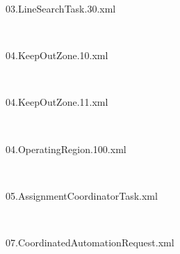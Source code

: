 \begin{fullwidth}
\begin{description}
        \item[\hypertarget{msg:03.LineSearchTask.30.xml}{03.LineSearchTask.30.xml}]  \hfill \ 
        \item[\hypertarget{msg:04.KeepOutZone.10.xml}{04.KeepOutZone.10.xml}]  \hfill \ 
        \item[\hypertarget{msg:04.KeepOutZone.11.xml}{04.KeepOutZone.11.xml}]  \hfill \ 
        \item[\hypertarget{msg:04.OperatingRegion.100.xml}{04.OperatingRegion.100.xml}]  \hfill \ 
        \item[\hypertarget{msg:05.AssignmentCoordinatorTask.xml}{05.AssignmentCoordinatorTask.xml}]  \hfill \ 
        \item[\hypertarget{msg:07.CoordinatedAutomationRequest.xml}{07.CoordinatedAutomationRequest.xml}]  \hfill \ 
\end{description}
\end{fullwidth}

